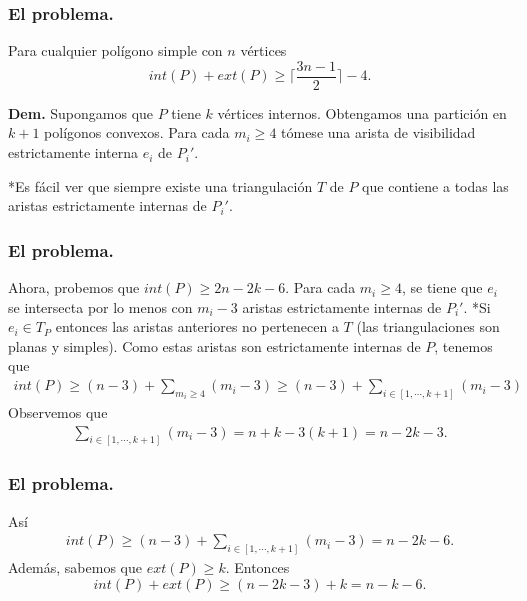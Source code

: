 
\begin{frame}
  \frametitle{El problema.}
  \begin{teorema}
    Para cualquier polígono simple con $n$ vértices
    \[int(P) + ext(P) \geq \lceil \frac{3n - 1}{2} \rceil - 4.\]
  \end{teorema}
  \textbf{Dem.} Supongamos que $P$ tiene $k$ vértices internos. Obtengamos una
  partición en $k + 1$ polígonos convexos. Para cada $m_i \geq 4$ tómese una arista
  de visibilidad estrictamente interna $e_i$ de $P_i'$.\newline

  *Es fácil ver que siempre existe una triangulación $T$ de $P$ que contiene a todas las aristas
  estrictamente internas de $P_i'$.
\end{frame}

\begin{frame}
  \frametitle{El problema.}
  Ahora, probemos que $int(P) \geq 2n - 2k - 6.$ Para cada $m_i \geq 4$, se tiene que $e_i$ se intersecta
  por lo menos con $m_i - 3$ aristas estrictamente internas de $P_i'$. *Si $e_i \in T_{P}$ entonces las
  aristas anteriores no pertenecen a $T$ (las triangulaciones son planas y simples). Como estas aristas
  son estrictamente internas de $P$, tenemos que
  \begin{eqnarray*}
    int(P) \geq (n - 3) + \sum_{m_i \geq 4} (m_i - 3) \geq (n - 3) + \sum_{i \in [1, \dotsm, k + 1]} (m_i - 3)
  \end{eqnarray*}
  Observemos que
  \begin{eqnarray*}
    \sum_{i \in [1, \dotsm, k + 1]} (m_i - 3) = n + k - 3(k + 1) = n - 2k - 3.
  \end{eqnarray*}
\end{frame}

\begin{frame}
  \frametitle{El problema.}
  Así
  \begin{eqnarray*}
    int(P) \geq  (n - 3) + \sum_{i \in [1, \dotsm, k + 1]} (m_i - 3) =  n - 2k - 6.
  \end{eqnarray*}
  Además, sabemos que $ext(P) \geq k$. Entonces
  \[int(P) + ext(P) \geq (n - 2k - 3) + k = n - k - 6.\]
\end{frame}

